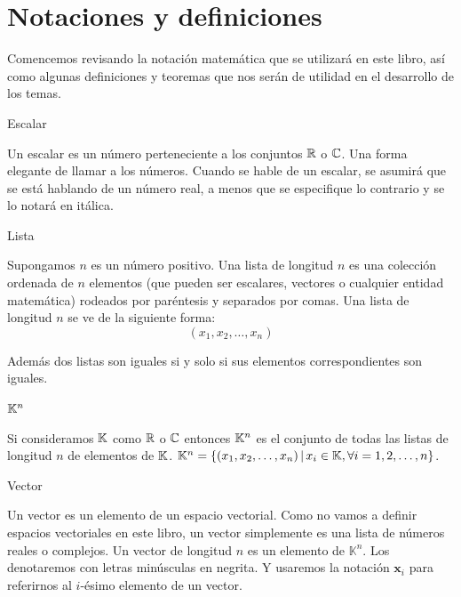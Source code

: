 \section{Notaciones y definiciones}

Comencemos revisando la notación matemática que se utilizará en este libro, así como algunas definiciones y teoremas que nos serán de utilidad en el desarrollo de los temas.

\begin{definition}
    Escalar 

    Un escalar es un número perteneciente a los conjuntos $\mathbb{R}$  o $\mathbb{C}$. Una forma elegante
    de llamar a los números.
    Cuando se hable de un escalar, se asumirá que se está hablando de un número real, a menos que se 
    especifique lo contrario y se lo notará en itálica.
\end{definition}


\begin{definition}
    Lista 

    Supongamos $n$ es un número positivo. Una lista de longitud $n$ es una colección ordenada de $n$ elementos 
    (que pueden ser escalares, vectores o cualquier entidad matemática) rodeados por paréntesis y separados por comas.
    Una lista de longitud $n$ se ve de la siguiente forma:
    \begin{equation}
        (x_1, x_2, \ldots, x_n)
    \end{equation}

    Además dos listas son iguales si y solo si sus elementos correspondientes son iguales.
\end{definition}

\begin{definition}
    $\mathbb{K}^n$
    
    Si consideramos $\mathbb{K}$ como $\mathbb{R}$ o $\mathbb{C}$ entonces $\mathbb{K}^n$ es el conjunto de todas las listas de longitud $n$ de elementos de $\mathbb{K}$.
    $ \mathbb{K}^n = \{(x_1, x_2, \ldots, x_n) \,|\, x_i \in \mathbb{K}, \forall i = 1, 2, \ldots, n\}$.
\end{definition}

\begin{definition}
    Vector
    
    Un vector es un elemento de un espacio vectorial. Como no vamos a definir espacios vectoriales en este libro, un vector simplemente es una lista de números reales o complejos. Un vector de longitud $n$ es un elemento de $\mathbb{K}^n$. Los denotaremos con letras minúsculas en negrita. Y usaremos la notación $\mathbf{x}_i$ para referirnos al $i$-ésimo elemento de un vector.
\end{definition}

